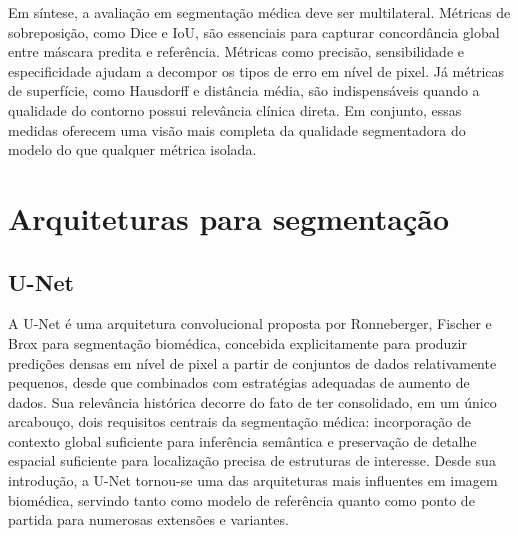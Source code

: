 \documentclass[tcc,capa]{texufpel}
\begin{document}
Em síntese, a avaliação em segmentação médica deve ser multilateral. Métricas de sobreposição, como Dice e IoU, são essenciais para capturar concordância global entre máscara predita e referência. Métricas como precisão, sensibilidade e especificidade ajudam a decompor os tipos de erro em nível de pixel. Já métricas de superfície, como Hausdorff e distância média, são indispensáveis quando a qualidade do contorno possui relevância clínica direta. Em conjunto, essas medidas oferecem uma visão mais completa da qualidade segmentadora do modelo do que qualquer métrica isolada. 

\section{Arquiteturas para segmentação}

\subsection{U-Net}

A U-Net é uma arquitetura convolucional proposta por Ronneberger, Fischer e Brox para segmentação biomédica, concebida explicitamente para produzir predições densas em nível de pixel a partir de conjuntos de dados relativamente pequenos, desde que combinados com estratégias adequadas de aumento de dados. Sua relevância histórica decorre do fato de ter consolidado, em um único arcabouço, dois requisitos centrais da segmentação médica: incorporação de contexto global suficiente para inferência semântica e preservação de detalhe espacial suficiente para localização precisa de estruturas de interesse. Desde sua introdução, a U-Net tornou-se uma das arquiteturas mais influentes em imagem biomédica, servindo tanto como modelo de referência quanto como ponto de partida para numerosas extensões e variantes. 
\end{document}
